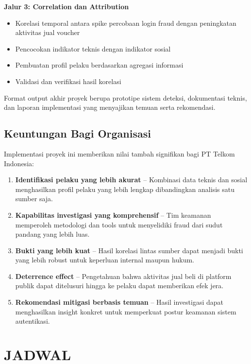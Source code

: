 \documentclass{ittelkom_ppi}
\begin{document}
\textbf{Jalur 3: Correlation dan Attribution}
\begin{itemize}
    \item Korelasi temporal antara spike percobaan login fraud dengan peningkatan aktivitas jual voucher
    \item Pencocokan indikator teknis dengan indikator sosial
    \item Pembuatan profil pelaku berdasarkan agregasi informasi
    \item Validasi dan verifikasi hasil korelasi
\end{itemize}

Format output akhir proyek berupa prototipe sistem deteksi, dokumentasi teknis, dan laporan implementasi yang menyajikan temuan serta rekomendasi.


\subsection{Keuntungan Bagi Organisasi}
\justifying

Implementasi proyek ini memberikan nilai tambah signifikan bagi PT Telkom Indonesia:

\begin{enumerate}
    \item \textbf{Identifikasi pelaku yang lebih akurat} -- Kombinasi data teknis dan sosial menghasilkan profil pelaku yang lebih lengkap dibandingkan analisis satu sumber saja.
    
    \item \textbf{Kapabilitas investigasi yang komprehensif} -- Tim keamanan memperoleh metodologi dan tools untuk menyelidiki fraud dari sudut pandang yang lebih luas.
    
    \item \textbf{Bukti yang lebih kuat} -- Hasil korelasi lintas sumber dapat menjadi bukti yang lebih robust untuk keperluan internal maupun hukum.
    
    \item \textbf{Deterrence effect} -- Pengetahuan bahwa aktivitas jual beli di platform publik dapat ditelusuri hingga ke pelaku dapat memberikan efek jera.
    
    \item \textbf{Rekomendasi mitigasi berbasis temuan} -- Hasil investigasi dapat menghasilkan insight konkret untuk memperkuat postur keamanan sistem autentikasi.
\end{enumerate}


\section{JADWAL}
\justifying
\end{document}
